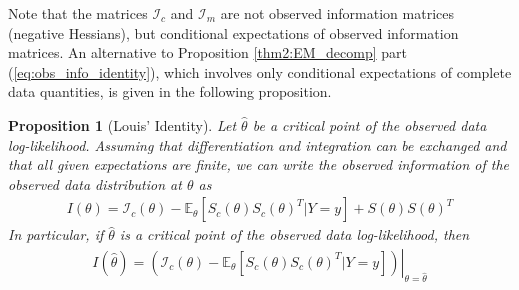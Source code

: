 \documentclass[11pt, oneside]{article}   	%
\newcommand{\bE}{\mathbb{E}}
\newtheorem{proposition}{Proposition}[section]
\begin{document}
Note that the matrices $\mathcal{I}_c$ and $\mathcal{I}_m$ are not observed information matrices (negative Hessians), but conditional expectations of observed information matrices. 
An alternative to Proposition \ref{thm2:EM_decomp} part (\ref{eq:obs_info_identity}), which involves only conditional expectations of complete data quantities, is given in the following proposition.

\begin{proposition}[Louis' Identity]
    \label{thm2:info_decomp}
    Let $\hat{\theta}$ be a critical point of the observed data log-likelihood. Assuming that differentiation and integration can be exchanged and that all given expectations are finite, we can write the observed information of the observed data distribution at $\theta$ as
    \begin{align}
        I(\theta) = \mathcal{I}_c(\theta) - \bE_{\theta} [ S_c(\theta) S_c(\theta)^T | Y=y] + S(\theta) S(\theta)^T
    \end{align}
    In particular, if $\hat{\theta}$ is a critical point of the observed data log-likelihood, then
    \begin{align}
        I(\hat{\theta}) = \left. \left(\mathcal{I}_c(\theta)  -  \bE_{\theta} [ S_c(\theta) S_c(\theta)^T | Y=y]\right) \right|_{\theta = \hat{\theta}} \label{eq:info_at_MLE}
    \end{align}
\end{proposition}
\end{document}
